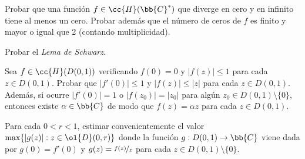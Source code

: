 \documentclass[12pt]{article}
\begin{document}
    \begin{ejercicio}[2.5 puntos]
        Probar que una función $f \in \cc{H}(\bb{C}^*)$ que diverge en cero y en infinito tiene al menos un cero. Probar además que el número de ceros de $f$ es finito y mayor o igual que 2 (contando multiplicidad).
    \end{ejercicio}

    \begin{ejercicio}[2.5 puntos]
        Probar el \emph{Lema de Schwarz}.
        \begin{lema*}[de Schwarz]
            Sea $f \in \cc{H}(D(0, 1))$ verificando $f(0) = 0$ y $|f(z)| \leq 1$ para cada $z \in D(0, 1)$. Probar que $|f'(0)| \leq 1$ y $|f(z)| \leq |z|$ para cada $z \in D(0, 1)$. Además, si ocurre $|f'(0)| = 1$ o $|f(z_0)| = |z_0|$ para algún $z_0 \in D(0, 1) \setminus \{0\}$, entonces existe $\alpha \in \bb{C}$ de modo que $f(z) = \alpha z$ para cada $z \in D(0, 1)$.
        \end{lema*}
        \begin{observacion}
            Para cada $0 < r < 1$, estimar convenientemente el valor $\max\{ |g(z)| : z \in \ol{D}(0, r) \}$ donde la función $g : D(0, 1) \to \bb{C}$ viene dada por $g(0) = f'(0)$ y $g(z) = \nicefrac{f(z)}{z}$ para cada $z \in D(0, 1)\setminus \{0\}$.
        \end{observacion}
    \end{ejercicio}


    \newpage
    \setcounter{ejercicio}{0}
    
\end{document}
